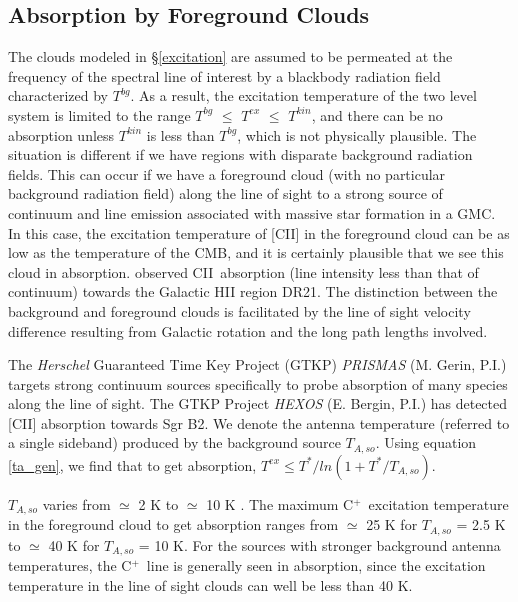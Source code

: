 \documentclass[12pt]{aastex}
\def \cp{C$^+$}
\def \C2{C{\sc II}}
\begin{document}
\subsection{Absorption by Foreground Clouds}
\label{absorption}

The clouds modeled in \S \ref{excitation} are assumed to be permeated at the frequency of the spectral line of interest by a blackbody radiation field characterized by $T^{bg}$.  
As a result, the excitation temperature of the two level system is limited to the range $T^{bg}$ $\leq$ $T^{ex}$ $\leq$ $T^{kin}$, and there can be no absorption unless $T^{kin}$ is less than $T^{bg}$, which is not physically plausible.
The situation is different if we have regions with disparate background radiation fields.  
This can occur if we have a foreground cloud (with no particular background radiation field) along the line of sight to a strong source of continuum and line emission associated with massive star formation in a GMC.  
In this case, the excitation temperature of [\C2] in the foreground cloud can be as low as the temperature of the CMB, and it is certainly plausible that we see this cloud in absorption.  
\citet{falgarone2010} observed \C2\ absorption (line intensity less than that of continuum) towards the Galactic HII region DR21.  
The distinction between the background and foreground clouds is facilitated by the line of sight velocity difference resulting from Galactic rotation and the long path lengths involved.

The {\it Herschel} Guaranteed Time Key Project (GTKP) {\it PRISMAS}  (M. Gerin, P.I.) targets strong continuum sources specifically to probe absorption of many species along the line of sight.  
The GTKP Project {\it HEXOS} (E. Bergin, P.I.) has detected [\C2] absorption towards Sgr B2.
We denote the antenna temperature (referred to a single sideband) produced by the background source  $T_{A, so}$.
Using equation \ref{ta_gen}, we find that to get absorption, $T^{ex} \leq T^*/ln(1 + T^*/T_{A, so})$.  

$T_{A, so}$ varies from $\simeq$ 2 K to $\simeq$ 10 K \citep{gerin2012a, gerin2012b}.
The maximum \cp\ excitation temperature in the foreground cloud to get absorption ranges from $\simeq$ 25 K for $T_{A, so}$ = 2.5 K to $\simeq$ 40 K for $T_{A, so}$ = 10 K.
For the sources with stronger background antenna temperatures, the \cp\ line is generally seen in absorption, since the excitation temperature in the line of sight clouds can well be less than  40 K.
\end{document}
